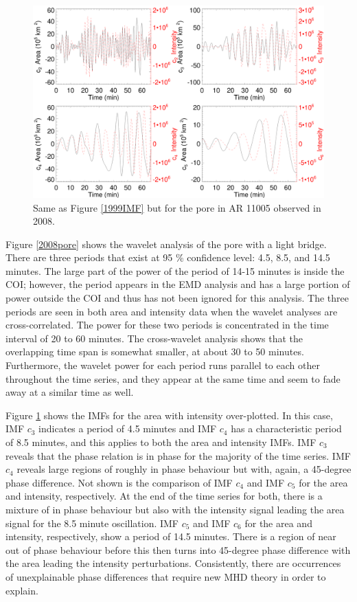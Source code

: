      \begin{figure}
     \centering
     \includegraphics[width=\textwidth]{2008_IMFs.eps}
     \caption{
       			Same as Figure \ref{1999IMF} but for the pore in AR 11005 observed in 2008.
        		  }
     \label{20008IMF}
     \end{figure}
      
	Figure \ref{2008pore} shows the wavelet analysis of the pore with a light bridge.
	There are three periods that exist at 95 \% confidence level: 4.5, 8.5, and 14.5 minutes.
	The large part of the power of the period of 14-15 minutes is inside the COI; however, the period appears in the EMD analysis and has a large portion of power outside the COI and thus has not been ignored for this analysis.
	The three periods are seen in both area and intensity data when the wavelet analyses are cross-correlated.
	The power for these two periods is concentrated in the time interval of 20 to 60 minutes.
	The cross-wavelet analysis shows that the overlapping time span is somewhat smaller, at about 30 to 50 minutes.
	Furthermore, the wavelet power for each period runs parallel to each other throughout the time series, and they appear at the same time and seem to fade away at a similar time as well.
	
	Figure \ref{20008IMF} shows the IMFs for the area with intensity over-plotted.
	In this case, IMF $c_{3}$ indicates a period of 4.5 minutes and IMF $c_{4}$ has a characteristic period of 8.5 minutes, and this applies to both the area and intensity IMFs.
	IMF $c_{3}$ reveals that the phase relation is in phase for the majority of the time series.
	IMF $c_{4}$ reveals large regions of roughly in phase behaviour but with, again, a 45-degree phase difference.
	Not shown is the comparison of IMF $c_{4}$ and IMF $c_{5}$ for the area and intensity, respectively.
	At the end of the time series for both, there is a mixture of in phase behaviour but also with the intensity signal leading the area signal for the 8.5 minute oscillation.
	IMF $c_{5}$ and IMF $c_{6}$ for the area and intensity, respectively, show a period of 14.5 minutes.
	There is a region of near out of phase behaviour before this then turns into 45-degree phase difference with the area leading the intensity perturbations.
	Consistently, there are occurrences of unexplainable phase differences that require new MHD theory in order to explain.
       
